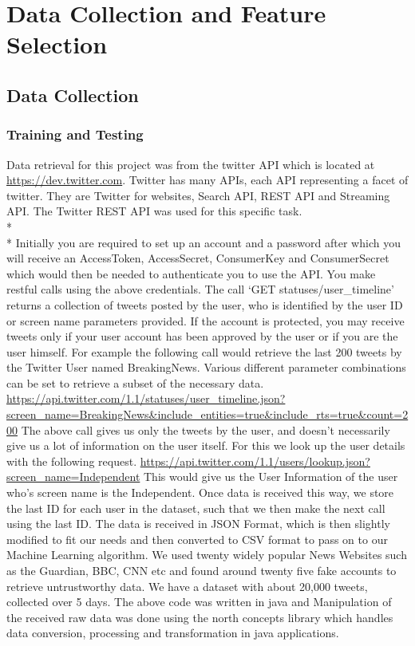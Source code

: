 \chapter{Data Collection and Feature Selection}
\section{Data Collection}
\subsection{Training and Testing}
Data retrieval for this project was from the twitter API which is located at \url{https://dev.twitter.com}.  Twitter has many APIs, each API representing a facet of twitter. They are Twitter for websites, Search API, REST API and Streaming API. The Twitter REST API was used for this specific task.\\*\\*
Initially you are required to set up an account and a password after which you will receive an AccessToken, AccessSecret, ConsumerKey and ConsumerSecret which would then be needed to authenticate you to use the API. You make restful calls using the above credentials. The call
`GET statuses/user\_timeline' returns a collection of tweets posted by the user, who is identified by the user ID or screen name parameters provided. If the account is protected, you may receive tweets only if your user account has been approved by the user or if you are the user himself. 
For example the following call would retrieve the last 200 tweets by the Twitter User named BreakingNews. Various different parameter combinations can be set to retrieve a subset of the necessary data. 
\url{https://api.twitter.com/1.1/statuses/user\_timeline.json?screen\_name=BreakingNews&include_entities=true&include_rts=true&count=200}
The above call gives us only the tweets by the user, and doesn't necessarily give us a lot of information on the user itself. For this we look up the user details with the following request.  
\url{https://api.twitter.com/1.1/users/lookup.json?screen\_name=Independent}
This would give us the User Information of the user who's screen name is the Independent. 
Once data is received this way, we store the last ID for each user in the dataset, such that we then make the next call using the last ID. The data is received in JSON Format, which is then slightly modified to fit our needs and then converted to CSV format to pass on to our Machine Learning algorithm. 
We used twenty widely popular News Websites such as the Guardian, BBC, CNN etc and found around twenty five fake accounts to retrieve untrustworthy data. We have a dataset with about 20,000 tweets, collected over 5 days. The above code was written in java and Manipulation of the received raw data was done using the north concepts library which handles data conversion, processing and transformation in java applications. 
